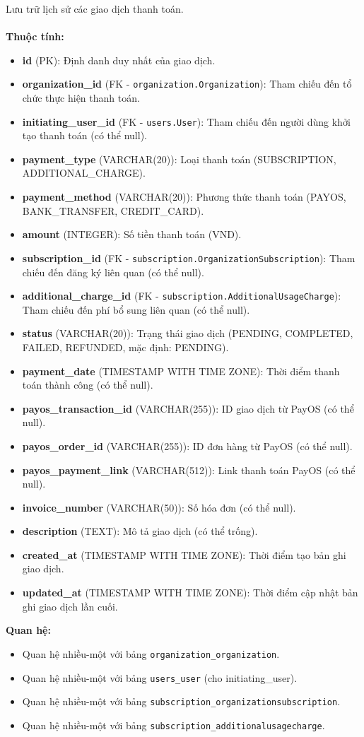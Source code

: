  Lưu trữ lịch sử các giao dịch thanh toán. \\\\
\indent\textbf{Thuộc tính:}
\begin{itemize}
    \item \textbf{id} (PK): Định danh duy nhất của giao dịch.
    \item \textbf{organization\_id} (FK - \texttt{organization.Organization}): Tham chiếu đến tổ chức thực hiện thanh toán.
    \item \textbf{initiating\_user\_id} (FK - \texttt{users.User}): Tham chiếu đến người dùng khởi tạo thanh toán (có thể null).
    \item \textbf{payment\_type} (VARCHAR(20)): Loại thanh toán (SUBSCRIPTION, ADDITIONAL\_CHARGE).
    \item \textbf{payment\_method} (VARCHAR(20)): Phương thức thanh toán (PAYOS, BANK\_TRANSFER, CREDIT\_CARD).
    \item \textbf{amount} (INTEGER): Số tiền thanh toán (VND).
    \item \textbf{subscription\_id} (FK - \texttt{subscription.OrganizationSubscription}): Tham chiếu đến đăng ký liên quan (có thể null).
    \item \textbf{additional\_charge\_id} (FK - \texttt{subscription.AdditionalUsageCharge}): Tham chiếu đến phí bổ sung liên quan (có thể null).
    \item \textbf{status} (VARCHAR(20)): Trạng thái giao dịch (PENDING, COMPLETED, FAILED, REFUNDED, mặc định: PENDING).
    \item \textbf{payment\_date} (TIMESTAMP WITH TIME ZONE): Thời điểm thanh toán thành công (có thể null).
    \item \textbf{payos\_transaction\_id} (VARCHAR(255)): ID giao dịch từ PayOS (có thể null).
    \item \textbf{payos\_order\_id} (VARCHAR(255)): ID đơn hàng từ PayOS (có thể null).
    \item \textbf{payos\_payment\_link} (VARCHAR(512)): Link thanh toán PayOS (có thể null).
    \item \textbf{invoice\_number} (VARCHAR(50)): Số hóa đơn (có thể null).
    \item \textbf{description} (TEXT): Mô tả giao dịch (có thể trống).
    \item \textbf{created\_at} (TIMESTAMP WITH TIME ZONE): Thời điểm tạo bản ghi giao dịch.
    \item \textbf{updated\_at} (TIMESTAMP WITH TIME ZONE): Thời điểm cập nhật bản ghi giao dịch lần cuối.
\end{itemize}
\textbf{Quan hệ:}
\begin{itemize}
    \item Quan hệ nhiều-một với bảng \texttt{organization\_organization}.
    \item Quan hệ nhiều-một với bảng \texttt{users\_user} (cho initiating\_user).
    \item Quan hệ nhiều-một với bảng \texttt{subscription\_organizationsubscription}.
    \item Quan hệ nhiều-một với bảng \texttt{subscription\_additionalusagecharge}.
\end{itemize}